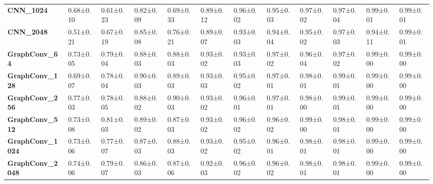 \begin{tabular}{llllllllllll}
\textbf{CNN\_1024      } &   0.68±0.10 &  0.61±0.23 &  0.82±0.09 &  0.69±0.33 &  0.89±0.12 &  0.96±0.02 &  0.95±0.03 &  0.97±0.02 &  0.97±0.04 &   0.99±0.01 &   0.99±0.01 \\
\textbf{CNN\_2048      } &   0.51±0.21 &  0.67±0.19 &  0.85±0.08 &  0.76±0.21 &  0.89±0.07 &  0.93±0.03 &  0.94±0.04 &  0.95±0.02 &  0.97±0.03 &   0.94±0.11 &   0.99±0.01 \\
\textbf{GraphConv\_64  } &   0.73±0.05 &  0.79±0.04 &  0.88±0.03 &  0.88±0.03 &  0.93±0.02 &  0.93±0.03 &  0.97±0.02 &  0.96±0.04 &  0.97±0.02 &   0.99±0.00 &   0.99±0.00 \\
\textbf{GraphConv\_128 } &   0.69±0.07 &  0.78±0.04 &  0.90±0.03 &  0.89±0.03 &  0.93±0.03 &  0.95±0.02 &  0.97±0.01 &  0.98±0.01 &  0.99±0.01 &   0.99±0.00 &   0.99±0.00 \\
\textbf{GraphConv\_256 } &   0.77±0.03 &  0.78±0.05 &  0.88±0.02 &  0.90±0.03 &  0.93±0.02 &  0.96±0.01 &  0.97±0.01 &  0.98±0.00 &  0.99±0.01 &   0.99±0.00 &   0.99±0.00 \\
\textbf{GraphConv\_512 } &   0.73±0.08 &  0.81±0.03 &  0.89±0.02 &  0.87±0.03 &  0.93±0.02 &  0.96±0.02 &  0.96±0.02 &  0.99±0.00 &  0.98±0.01 &   0.99±0.00 &   0.99±0.00 \\
\textbf{GraphConv\_1024} &   0.73±0.06 &  0.77±0.07 &  0.87±0.03 &  0.88±0.03 &  0.93±0.02 &  0.95±0.02 &  0.96±0.01 &  0.98±0.01 &  0.98±0.01 &   0.99±0.00 &   0.99±0.00 \\
\textbf{GraphConv\_2048} &   0.74±0.06 &  0.79±0.07 &  0.86±0.03 &  0.87±0.06 &  0.92±0.03 &  0.96±0.02 &  0.96±0.02 &  0.98±0.01 &  0.98±0.01 &   0.99±0.00 &   0.99±0.00 \\
\bottomrule
\end{tabular}

